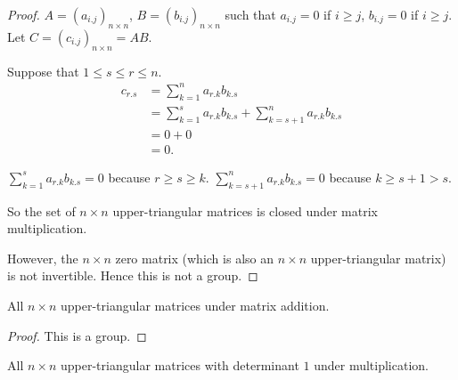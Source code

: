 \begin{proof}
    $A = {(a_{i.j})}_{n\times n}$, $B = {(b_{i.j})}_{n\times n}$ such that $a_{i.j} = 0$ if $i\geq j$, $b_{i.j} = 0$ if $i\geq j$. Let $C = {(c_{i.j})}_{n\times n} = AB$.

    Suppose that $1\le s\le r\le n$.
    \begin{align*}
        c_{r.s} & = \sum^{n}_{k=1}a_{r.k}b_{k.s}                                  \\
                & = \sum^{s}_{k=1}a_{r.k}b_{k.s} + \sum^{n}_{k=s+1}a_{r.k}b_{k.s} \\
                & = 0 + 0                                                         \\
                & = 0.
    \end{align*}

    $\displaystyle\sum^{s}_{k=1}a_{r.k}b_{k.s} = 0$ because $r\ge s\ge k$. $\displaystyle\sum^{n}_{k=s+1}a_{r.k}b_{k.s} = 0$ because $k \geq s + 1 > s$.

    So the set of $n\times n$ upper-triangular matrices is closed under matrix multiplication.

    However, the $n\times n$ zero matrix (which is also an $n\times n$ upper-triangular matrix) is not invertible. Hence this is not a group.
\end{proof}

\newpage
\begin{exercise}
    All $n\times n$ upper-triangular matrices under matrix addition.
\end{exercise}

\begin{proof}
    This is a group.
\end{proof}

\newpage
\begin{exercise}
    All $n\times n$ upper-triangular matrices with determinant $1$ under multiplication.
\end{exercise}

